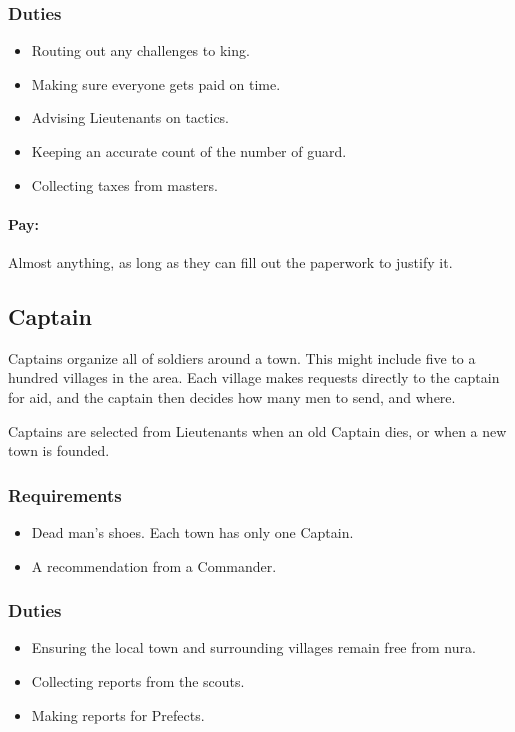 \begin{multicols}{2}
\subsubsection{Duties}

\begin{itemize}
  \item
  Routing out any challenges to \gls{king}.
  \item
  Making sure everyone gets paid on time.
  \item
  Advising Lieutenants on tactics.
  \item
  Keeping an accurate count of the number of \gls{guard}.
  \item
  Collecting taxes from masters.
\end{itemize}

\paragraph{Pay:}
Almost anything, as long as they can fill out the paperwork to justify it.

\subsection{Captain}

Captains organize all of soldiers around a town.
This might include five to a hundred villages in the area.
Each village makes requests directly to the captain for aid, and the captain then decides how many men to send, and where.

Captains are selected from Lieutenants when an old Captain dies, or when a new town is founded.

\subsubsection{Requirements}

\begin{itemize}
  \item
  Dead man's shoes.
  Each town has only one Captain.
  \item
  A recommendation from a Commander.
\end{itemize}

\subsubsection{Duties}

\begin{itemize}
  \item
  Ensuring the local town and surrounding villages remain free from nura.
  \item
  Collecting reports from the scouts.
  \item
  Making reports for Prefects.
\end{itemize}


\end{multicols}
